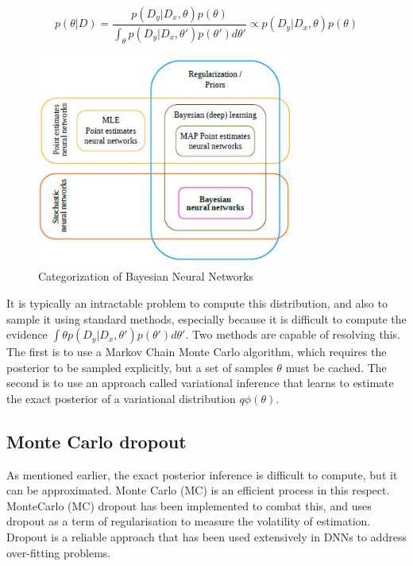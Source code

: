 \documentclass[journal]{IEEEtran}
\begin{document}
\begin{equation*}
    p(\theta|D) = \frac{p(D_y|D_x,\theta)p(\theta)}{\int_\theta p(D_y|D_x,\theta')p(\theta')d\theta'} \propto p(D_y|D_x,\theta)p(\theta)
\end{equation*}

\begin{figure}[ht]
  \centering
  \includegraphics[width=85mm]{figures/BNN.JPG}
  \caption{Categorization of Bayesian Neural Networks\cite{jospin2020hands}}
\end{figure}

It is typically an intractable problem to compute this distribution, and also to sample it using
standard methods, especially because it is difficult to compute the evidence  $\int \theta p(D_y|D_x,\theta')p(\theta')d\theta'$.
Two methods are
capable of resolving this.
The first is to use a Markov Chain Monte Carlo algorithm, which requires the
posterior to be sampled explicitly, but a set of  samples $\theta$ must be cached.
The second is to use an approach called variational inference that
learns to estimate the exact posterior of a variational distribution $q \phi(\theta)$. 

\subsection{Monte Carlo dropout}

As mentioned earlier, the exact posterior inference is
difficult to compute, but it can be approximated.
Monte Carlo (MC) is an
efficient process in this respect.
MonteCarlo (MC) dropout has been implemented to combat this, and uses
dropout as a term of regularisation to measure the volatility of estimation.
Dropout is a reliable approach that has been
used extensively in DNNs to address over-fitting problems\cite{jospin2020hands}. 
\end{document}
